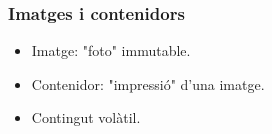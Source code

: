 \begin{frame}
  \frametitle{Imatges i contenidors}
  \begin{itemize}%
	\item Imatge: "foto" immutable.
	\item Contenidor: "impressió" d'una imatge.
	\item Contingut volàtil.
  \end{itemize}
\end{frame}
